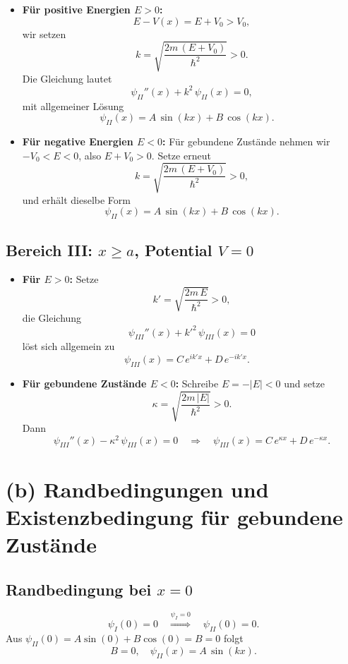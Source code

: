 \documentclass[a4paper,12pt]{article}
\begin{document}
\begin{itemize}
  \item \textbf{Für positive Energien $E>0$:}
    \[
      E - V(x) = E + V_0 > V_0,
    \]
    wir setzen
    \[
      k = \sqrt{\frac{2m\,(E+V_0)}{\hbar^2}} > 0.
    \]
    Die Gleichung lautet
    \[
    \psi_{II}''(x) + k^2\,\psi_{II}(x) = 0,
    \]
    mit allgemeiner Lösung
    \[
      \psi_{II}(x) = A\,\sin(kx) + B\,\cos(kx).
      \quad %
    \]
  \item \textbf{Für negative Energien $E<0$:} Für gebundene Zustände nehmen wir $-V_0<E<0$,
    also $E+V_0>0$. Setze erneut
    \[
      k = \sqrt{\frac{2m\,(E+V_0)}{\hbar^2}}>0,
    \]
    und erhält dieselbe Form
    \[
      \psi_{II}(x) = A\,\sin(kx) + B\,\cos(kx).
    \]
\end{itemize}

\subsection*{Bereich III: \boldmath $x\ge a$, Potential $V=0$}

\begin{itemize}
  \item \textbf{Für $E>0$:} Setze
    \[
      k' = \sqrt{\frac{2m\,E}{\hbar^2}}>0,
    \]
    die Gleichung
    \[
      \psi_{III}''(x) + k'^2 \,\psi_{III}(x) = 0
    \]
    löst sich allgemein zu
    \[
      \psi_{III}(x) = C\,e^{i k' x} + D\,e^{-i k' x}.
      \quad %
    \]
  \item \textbf{Für gebundene Zustände $E<0$:} Schreibe $E=-|E|<0$ und setze
    \[
      \kappa = \sqrt{\frac{2m\,|E|}{\hbar^2}}>0.
    \]
    Dann
    \[
      \psi_{III}''(x) - \kappa^2\,\psi_{III}(x) = 0
      \quad\Longrightarrow\quad
      \psi_{III}(x) = C\,e^{\kappa x} + D\,e^{-\kappa x}.
    \]
\end{itemize}

\section{(b) Randbedingungen und Existenzbedingung für gebundene Zustände}

\subsection*{Randbedingung bei \boldmath $x=0$}

\[
\psi_I(0)=0 \quad\overset{\psi_I=0}{\Longrightarrow}\quad
\psi_{II}(0)=0.
\]
Aus $\psi_{II}(0)=A\sin(0)+B\cos(0)=B=0$ folgt
\[
B=0,\quad
\psi_{II}(x)=A\,\sin(kx).
\]
\end{document}
